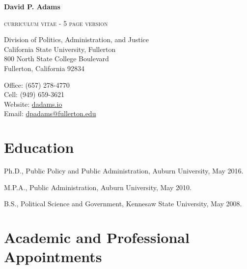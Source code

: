 \documentclass[12pt,letterpaper]{article}
\def\name{David P. Adams}
\renewenvironment{itemize}{
  \begin{list}{}{
    \setlength{\leftmargin}{1.5em}
    \setlength{\itemsep}{0.25em}
    \setlength{\parskip}{0pt}
    \setlength{\parsep}{0.25em}
  }
}{
  \end{list}
}
\begin{document}
    
    
\centerline{\huge \bf \name}
\smallskip
\centerline{\small{\textsc{curriculum vitae - 5 page version}}}

\bigskip

\noindent

\begin{minipage}[t]{0.55\textwidth}
    Division of Politics, Administration, and Justice \\
    California State University, Fullerton \\
    800 North State College Boulevard  \\
    Fullerton, California 92834
\end{minipage}
\hfill
\begin{minipage}[t]{0.4\textwidth}
    Office: \hspace{6em}(657) 278-4770 \\
    Cell: \hspace{6.5em} (949) 659-3621 \\
    Website: \hspace{6.5em}\href{https://dadams.io}{dadams.io} \\
    Email: \hspace{1.2em}\href{mailto:dpadams@fullerton.edu}{dpadams@fullerton.edu}
\end{minipage}


  \section*{Education}

  \begin{itemize}\leftmargin=2pt\itemindent=-15pt
  \item Ph.D., Public Policy and Public Administration, Auburn University, May 2016. \vspace{0.2cm}
  \item M.P.A., Public Administration, Auburn University, May 2010. \vspace{0.2cm}
  \item B.S., Political Science and Government, Kennesaw State University, May 2008.
  \end{itemize}
  
  \section*{Academic and Professional Appointments}
\end{document}
